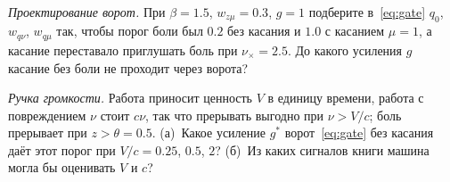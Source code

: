 \begin{exercise}[\lvlB]
\label{ex:14:6}
\emph{Проектирование ворот.} При $\beta=1.5$, $w_{z\mu}=0.3$, $g=1$ подберите в~\eqref{eq:gate} $q_0$, $w_{q\nu}$, $w_{q\mu}$ так, чтобы порог боли был $0.2$ без касания и $1.0$ с касанием $\mu=1$, а касание переставало приглушать боль при $\nu_\times=2.5$. До какого усиления $g$ касание без боли не проходит через ворота?
\end{exercise}

\begin{exercise}[\lvlC]
\label{ex:14:7}
\emph{Ручка громкости.} Работа приносит ценность $V$ в единицу времени, работа с повреждением $\nu$ стоит $c\nu$, так что прерывать выгодно при $\nu>V/c$; боль прерывает при $z>\theta=0.5$. (а)~Какое усиление $g^*$ ворот~\eqref{eq:gate} без касания даёт этот порог при $V/c=0.25$, $0.5$, $2$? (б)~Из каких сигналов книги машина могла бы оценивать $V$ и $c$?
\end{exercise}
